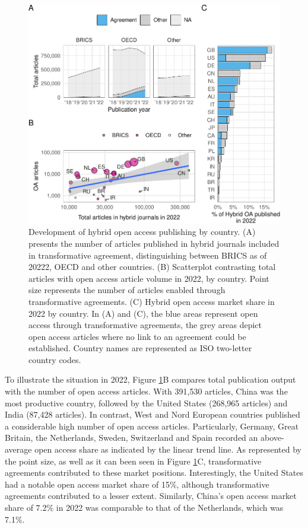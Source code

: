 \documentclass[a4paper,man,floatsintext,longtable,noextraspace,12pt]{apa6}
\begin{document}
\begin{figure}[ht!]

{\centering \includegraphics[width=0.99\linewidth,]{fig/country_patch-1} 

}

\caption{Development of hybrid open access publishing by country. (A) presents the number of articles published in hybrid journals included in transformative agreement, distinguishing between BRICS as of 20222, OECD and other countries. (B) Scatterplot contrasting total articles with open access article volume in 2022, by country. Point size represents the number of articles enabled through transformative agreements. (C) Hybrid open access market share in 2022 by country. In (A) and (C), the blue areas represent open access through transformative agreements, the grey areas depict open access articles where no link to an agreement could be established. Country names are represented as ISO two-letter country codes.}\label{fig:country_patch}
\end{figure}

To illustrate the situation in 2022, Figure \ref{fig:country_patch}B
compares total publication output with the number of open access
articles. With 391,530 articles, China was the most productive country,
followed by the United States (268,965 articles) and India (87,428
articles). In contrast, West and Nord European countries published a
considerable high number of open access articles. Particularly, Germany,
Great Britain, the Netherlands, Sweden, Switzerland and Spain recorded
an above-average open access share as indicated by the linear trend
line. As represented by the point size, as well as it can been seen in
Figure \ref{fig:country_patch}C, transformative agreements contributed
to these market positions. Interestingly, the United States had a
notable open access market share of 15\%, although transformative
agreements contributed to a lesser extent. Similarly, China's open
access market share of 7.2\% in 2022 was comparable to that of the
Netherlands, which was 7.1\%.
\end{document}
